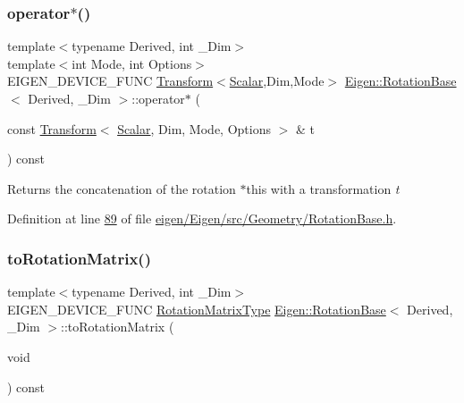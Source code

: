\subsubsection{\texorpdfstring{operator$\ast$()}{operator*()}\hspace{0.1cm}{\footnotesize\ttfamily [8/8]}}
{\footnotesize\ttfamily template$<$typename Derived, int \+\_\+\+Dim$>$ \\
template$<$int Mode, int Options$>$ \\
E\+I\+G\+E\+N\+\_\+\+D\+E\+V\+I\+C\+E\+\_\+\+F\+U\+NC \hyperlink{group___geometry___module_class_eigen_1_1_transform}{Transform}$<$\hyperlink{class_eigen_1_1_rotation_base_af9b43eac462d7aa70b018efd49c13ef4}{Scalar},Dim,Mode$>$ \hyperlink{class_eigen_1_1_rotation_base}{Eigen\+::\+Rotation\+Base}$<$ Derived, \+\_\+\+Dim $>$\+::operator$\ast$ (\begin{DoxyParamCaption}\item[{const \hyperlink{group___geometry___module_class_eigen_1_1_transform}{Transform}$<$ \hyperlink{class_eigen_1_1_rotation_base_af9b43eac462d7aa70b018efd49c13ef4}{Scalar}, Dim, Mode, Options $>$ \&}]{t }\end{DoxyParamCaption}) const\hspace{0.3cm}{\ttfamily [inline]}}

\begin{DoxyReturn}{Returns}
the concatenation of the rotation {\ttfamily $\ast$this} with a transformation {\itshape t} 
\end{DoxyReturn}


Definition at line \hyperlink{eigen_2_eigen_2src_2_geometry_2_rotation_base_8h_source_l00089}{89} of file \hyperlink{eigen_2_eigen_2src_2_geometry_2_rotation_base_8h_source}{eigen/\+Eigen/src/\+Geometry/\+Rotation\+Base.\+h}.

\mbox{\label{class_eigen_1_1_rotation_base_aac726e89402a427c605514ce31b01e42}} 
\subsubsection{\texorpdfstring{to\+Rotation\+Matrix()}{toRotationMatrix()}\hspace{0.1cm}{\footnotesize\ttfamily [1/2]}}
{\footnotesize\ttfamily template$<$typename Derived, int \+\_\+\+Dim$>$ \\
E\+I\+G\+E\+N\+\_\+\+D\+E\+V\+I\+C\+E\+\_\+\+F\+U\+NC \hyperlink{class_eigen_1_1_rotation_base_a83602509674c9d635551998460342951}{Rotation\+Matrix\+Type} \hyperlink{class_eigen_1_1_rotation_base}{Eigen\+::\+Rotation\+Base}$<$ Derived, \+\_\+\+Dim $>$\+::to\+Rotation\+Matrix (\begin{DoxyParamCaption}\item[{void}]{ }\end{DoxyParamCaption}) const\hspace{0.3cm}{\ttfamily [inline]}}

